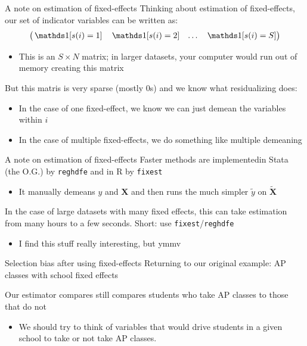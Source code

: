 \documentclass[aspectratio=169,t,11pt,table]{beamer}
\begin{document}
\begin{frame}{A note on estimation of fixed-effects}
  Thinking about estimation of fixed-effects, our set of indicator variables can be written as:
  $$
    \begin{pmatrix}
      \one{s(i) = 1} & \one{s(i) = 2} & \dots & \one{s(i) = S}
    \end{pmatrix}
  $$
  \begin{itemize}
    \item This is an $S \times N$ matrix; in larger datasets, your computer would run out of memory creating this matrix
  \end{itemize}

  \bigskip
  But this matris is very sparse (mostly 0s) and we know what residualizing does:
  \begin{itemize}
    \item In the case of one fixed-effect, we know we can just demean the variables within $i$ 
    
    \item In the case of multiple fixed-effects, we do something like multiple demeaning
  \end{itemize}
\end{frame}

\begin{frame}{A note on estimation of fixed-effects}
  Faster methods are implementedin Stata (the O.G.) by \texttt{reghdfe} and in R by \texttt{fixest}
  \begin{itemize}
    \item It manually demeans $y$ and $\bm{X}$ and then runs the much simpler $\tilde{y}$ on $\tilde{\bm{X}}$
  \end{itemize}

  \bigskip
  In the case of large datasets with many fixed effects, this can take estimation from many hours to a few seconds. Short: use \texttt{fixest}/\texttt{reghdfe}
  \begin{itemize}
    \item I find this stuff really interesting, but ymmv
  \end{itemize}
\end{frame}

\begin{frame}{Selection bias after using fixed-effects}
  Returning to our original example: AP classes with school fixed effects 

  \bigskip
  Our estimator compares still compares students who take AP classes to those that do not
  \begin{itemize}
    \item We should try to think of variables that would drive students in a given school to take or not take AP classes.
  \end{itemize}
\end{frame}
\end{document}
